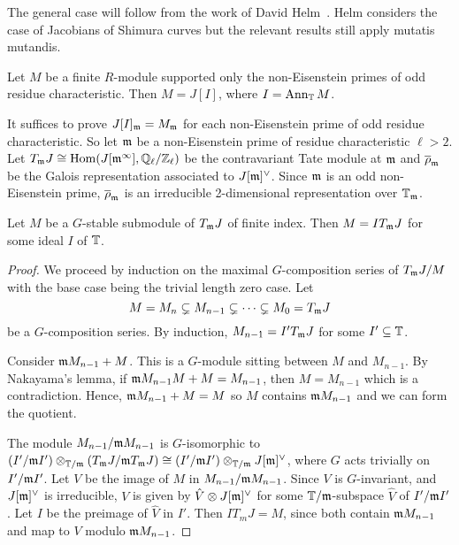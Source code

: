 \documentclass{article}
\begin{document}
The general case will follow from the work of David Helm~\cite{helm:jacobian}.
Helm considers the case of Jacobians of Shimura curves but the relevant results
still apply mutatis mutandis.

\begin{theorem}%
    \label{theorem:non_eisenstein_kernel_hecke}
    Let $M$ be a finite $R$-module supported only the non-Eisenstein primes of
    odd residue characteristic. Then $M=J[I]$, where $I=\operatorname{Ann}_{\mathbb{T}} M$.
\end{theorem}

It suffices to prove $J[I]_{\mathfrak{m}} = M_{\mathfrak{m}}$ for each non-Eisenstein prime of odd
residue characteristic. So let $\mathfrak{m}$ be a non-Eisenstein prime of residue
characteristic $\ell>2$. Let $T_{\mathfrak{m}} J\cong \operatorname{Hom}(J[\mathfrak{m}^\infty],
\mathbb{Q}_\ell/\mathbb{Z}_\ell)$ be the contravariant Tate module at $\mathfrak{m}$ and
$\overline{\rho}_{\mathfrak{m}}$ be the Galois representation associated to $J[\mathfrak{m}]^\vee$.
Since $\mathfrak{m}$ is an odd non-Eisenstein prime, $\overline{\rho}_{\mathfrak{m}}$ is an
irreducible 2-dimensional representation over $\mathbb{T}_{\mathfrak{m}}$.

\begin{lemma}\label{lemma:finite_index}
    Let $M$ be a $G$-stable submodule of $T_{\mathfrak{m}} J$ of finite index. Then
    $M=IT_{\mathfrak{m}} J$ for some ideal $I$ of $\mathbb{T}$.
\end{lemma}
\begin{proof}
    We proceed by induction on the maximal $G$-composition series of $T_{\mathfrak{m}} J/M$
    with the base case being the trivial length zero case. Let 
    \[
        M = M_n \subsetneq M_{n-1} \subsetneq \cdots \subsetneq M_0 = T_{\mathfrak{m}} J
    \]
    be a $G$-composition series. By induction, $M_{n-1} = I'T_{\mathfrak{m}} J$ for some
    $I'\subseteq \mathbb{T}$.

    Consider $\mathfrak{m} M_{n-1} + M$. This is a $G$-module sitting between $M$ and
    $M_{n-1}$. By Nakayama's lemma, if $\mathfrak{m} M_{n-1} M + M = M_{n-1}$, then
    $M=M_{n-1}$ which is a contradiction. Hence, $\mathfrak{m} M_{n-1}+M=M$ so $M$
    contains $\mathfrak{m} M_{n-1}$ and we can form the quotient.

    The module $M_{n-1}/\mathfrak{m} M_{n-1}$ is $G$-isomorphic to $(I'/\mathfrak{m}
    I')\otimes_{\mathbb{T}/\mathfrak{m}} (T_{\mathfrak{m}} J/\mathfrak{m} T_{\mathfrak{m}} J) \cong (I'/\mathfrak{m} I')\otimes_{\mathbb{T}/\mathfrak{m}}
    J[\mathfrak{m}]^\vee$, where $G$ acts trivially on $I'/\mathfrak{m} I'$. Let $V$ be the image
    of $M$ in $M_{n-1}/\mathfrak{m} M_{n-1}$. Since $V$ is $G$-invariant, and
    $J[\mathfrak{m}]^\vee$ is irreducible, $V$ is given by $\hat{V}\otimes J[\mathfrak{m}]^\vee$
    for some $\mathbb{T}/\mathfrak{m}$-subspace $\hat{V}$ of $I'/\mathfrak{m} I'$. Let $I$ be the preimage
    of $\hat{V}$ in $I'$. Then $IT_m J = M$, since both contain $\mathfrak{m} M_{n-1}$
    and map to $V$ modulo $\mathfrak{m} M_{n-1}$.
\end{proof}
\end{document}
